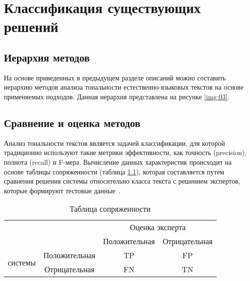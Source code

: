 \chapter{Классификация существующих решений}

\section{Иерархия методов}

На основе приведенных в предыдущем разделе описаний можно составить иерархию
методов анализа тональности естественно-языковых текстов на основе применяемых
подходов. Данная иерархия представлена на рисунке \ref{img:03}.


\section{Сравнение и оценка методов}

Анализ тональности текстов является задачей классификации, для которой
традиционно используют такие метрики эффективности, как точность
(precision), полнота (recall) и F-мера. Вычисление данных
характеристик происходит на основе таблицы сопряженности (таблица
\ref{tab:01}), которая составляется путем сравнения решения системы
относительно класса текста с решением экспертов, которые
формируют тестовые данные~\cite{article18}. 
~\\

\noindent
\begin{table}
\captionsetup{format=hang,justification=raggedright,
              singlelinecheck=off,width=13.8cm}
\begin{center}
\caption{Таблица сопряженности\label{tab:01}}
\begin{tabular}{|c|c|c|c|}
    \hline
    \multicolumn{2}{|c|}{\multirow{2}{*}{}} & \multicolumn{2}{c|}{Оценка
                                                                  эксперта} \\
    \cline{3-4}
    \multicolumn{2}{|c|}{} & Положительная & Отрицательная \\
    \hline
    \multirow{2}{*}{\parbox[c]{2cm}{ системы}} 
    & Положительная & TP & FP \\
    \cline{2-4}
    & Отрицательная & FN & TN \\
    \hline
\end{tabular}
\end{center}
\end{table}

